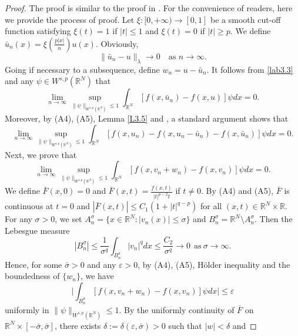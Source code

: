 \documentclass[10pt,a4paper]{amsart}
\numberwithin{equation}{section}
\begin{document}
\begin{proof}
The proof is similar to the proof in \cite{r6}. 
For the convenience of readers, here we provide the process of proof. 
Let $\xi: [0, +\infty)\to [0,1]$ be a smooth cut-off function satisfying $\xi(t)=1$ 
if $|t|\leq1$ and $\xi(t)=0$ if $|t|\geq p$. 
We define $\bar{u}_n(x)=\xi(\frac{p|x|}{n})u(x)$. Obviously,
\begin{equation}\label{lab3.3}
\|\bar{u}_n-u\|_\lambda\to 0 \quad \text{as } n\to \infty.
\end{equation}
Going if necessary to a subsequence, define $w_n=u-\bar{u}_n$. 
It follows from \eqref{lab3.3} and any $\psi\in W^{s,p}(\mathbb{R}^N)$ that
\begin{equation}\label{lab3.4}
\lim_{n\to \infty}\sup_{\|\psi\|_{W^{s,p}(\mathbb{R}^N)}\leq1}
\int_{\mathbb{R}^N} [f(x,\bar{u}_n)-f(x,u)]\psi dx=0.
\end{equation}
Moreover, by (A4), (A5), Lemma \ref{L3.5} and \cite[Lemma 3.3]{r15}, a standard
argument shows that
\begin{equation}\label{lab3.5}
\lim_{n\to \infty}\sup_{\|\psi\|_{W^{s,p}(\mathbb{R}^N)}\leq1}
\int_{\mathbb{R}^N} [f(x,u_n)-f(x,u_n-\bar{u}_n)-f(x,\bar{u}_n)]\psi dx=0.
\end{equation}
Next, we prove that
\begin{equation}\label{lab3.6}
\lim_{n\to \infty}\sup_{\|\psi\|_{W^{s,p}(\mathbb{R}^N)}\leq1}
\int_{\mathbb{R}^N} [f(x,v_n+w_n)-f(x,v_n)]\psi dx=0.
\end{equation}
We define $\bar{F}(x,0)=0$ and
$\bar{F}(x,t)=\frac{f(x,t)}{|t|^{p-2}t}$ if $t\neq0.$
By (A4) and (A5), $\bar{F}$ is continuous at $t=0$ and
$|\bar{F}(x,t)|\leq C_1(1+|t|^{q-p})$ for all $(x,t)\in\mathbb{R}^N\times\mathbb{R}$. 
For any $\sigma>0$, we set $A^\sigma_n=\{x\in \mathbb{R}^N: |v_n(x)|\leq \sigma \}$ 
and $B^\sigma_n=\mathbb{R}^N\setminus A^\sigma_n$. Then the Lebesgue measure
$$
|B^\sigma_n|\leq\frac{1}{\sigma^q}\int_{B^\sigma_n}|v_n|^qdx
\leq\frac{C_2}{\sigma^q}\to 0\ \ \text{as}\ \sigma\to \infty.
$$
Hence, for some $\bar{\sigma}>0$ and any $\varepsilon>0$, by (A4), (A5),
H\"older inequality and the boundedness of $\{w_n\}$, we have
\begin{equation}\label{lab3.7}
\Big|\int_{B^{\bar{\sigma}}_n} [f(x,v_n+w_n)-f(x,v_n)]\psi dx\Big|\leq\varepsilon
\end{equation}
uniformly in $\|\psi\|_{W^{s,p}(\mathbb{R}^N)}\leq1$. 
By the uniformly continuity of $\bar{F}$ on 
$\mathbb{R}^N\times[-\bar{\sigma}, \bar{\sigma}]$, there exists 
$\delta:=\delta(\varepsilon, \bar{\sigma})>0$ such that $|w|<\delta$ and

\end{proof}
\end{document}
